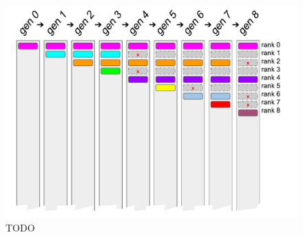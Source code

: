 \begin{figure}
  \centering
  \includegraphics[width=\textwidth]{img/deposit-prune-example}
  \caption{
    TODO
  }
  \label{fig:deposit-prune-example}
\end{figure}
